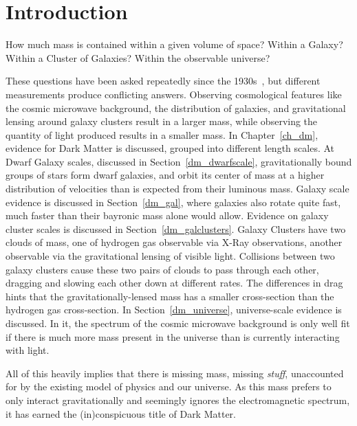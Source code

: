 \cleartooddpage[\thispagestyle{empty}]
\chapter{Introduction}

  How much mass is contained within a given volume of space?
  Within a Galaxy?
  Within a Cluster of Galaxies?
  Within the observable universe?

  These questions have been asked repeatedly since the 1930s~\cite{zwicky1937}, but different measurements produce conflicting answers.
  Observing cosmological features like the cosmic microwave background, the distribution of galaxies, and gravitational lensing around galaxy clusters result in a larger mass, while observing the quantity of light produced results in a smaller mass.
  In Chapter~\ref{ch_dm}, evidence for Dark Matter is discussed, grouped into different length scales.
  At Dwarf Galaxy scales, discussed in Section~\ref{dm_dwarfscale}, gravitationally bound groups of stars form dwarf galaxies, and orbit its center of mass at a higher distribution of velocities than is expected from their luminous mass.
  Galaxy scale evidence is discussed in Section~\ref{dm_gal}, where galaxies also rotate quite fast, much faster than their bayronic mass alone would allow.
  Evidence on galaxy cluster scales is discussed in Section~\ref{dm_galclusters}.
  Galaxy Clusters have two clouds of mass, one of hydrogen gas observable via X-Ray observations, another observable via the gravitational lensing of visible light.
  Collisions between two galaxy clusters cause these two pairs of clouds to pass through each other, dragging and slowing each other down at different rates.
  The differences in drag hints that the gravitationally-lensed mass has a smaller cross-section than the hydrogen gas cross-section.
  In Section~\ref{dm_universe}, universe-scale evidence is discussed.
  In it, the spectrum of the cosmic microwave background is only well fit if there is much more mass present in the universe than is currently interacting with light.

  All of this heavily implies that there is missing mass, missing \textit{stuff}, unaccounted for by the existing model of physics and our universe.
  As this mass prefers to only interact gravitationally and seemingly ignores the electromagnetic spectrum, it has earned the (in)conspicuous title of Dark Matter.

